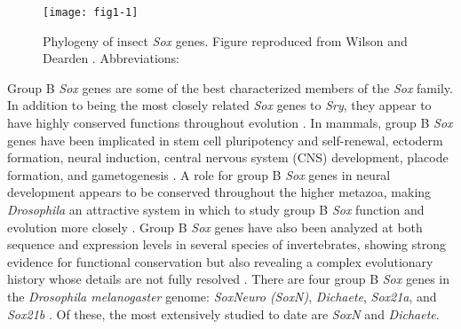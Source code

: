 \begin{figure}
\centering
\texttt{[image: fig1-1]}
\caption{Phylogeny of insect \emph{Sox} genes. Figure reproduced from Wilson and Dearden \citet{wilson_evolution_2008}. Abbreviations:}
\label{Figure 1.1}
\end{figure}

Group B \emph{Sox} genes are some of the best characterized members of the \emph{Sox} family. In addition to being the most closely related \emph{Sox} genes to \emph{Sry}, they appear to have highly conserved functions throughout evolution \citep{collignon_comparison_1996,mckimmie_conserved_2005}. In mammals, group B \emph{Sox} genes have been implicated in stem cell pluripotency and self-renewal, ectoderm formation, neural induction, central nervous system (CNS) development, placode formation, and gametogenesis \citep{guth_having_2008}. A role for group B \emph{Sox} genes in neural development appears to be conserved throughout the higher metazoa, making \emph{Drosophila} an attractive system in which to study group B \emph{Sox} function and evolution more closely \citep{uwanogho_embryonic_1995-1,wood_comparative_1999,wegner_stem_2005}. Group B \emph{Sox} genes have also been analyzed at both sequence and expression levels in several species of invertebrates, showing strong evidence for functional conservation but also revealing a complex evolutionary history whose details are not fully resolved \citep{wilson_evolution_2008,mckimmie_conserved_2005,wei_identification_2010,pioro_expression_2006,zhong_parallel_2011}. There are four group B \emph{Sox} genes in the \emph{Drosophila melanogaster} genome: \emph{SoxNeuro (SoxN)}, \emph{Dichaete}, \emph{Sox21a}, and \emph{Sox21b} \citep{mckimmie_conserved_2005}. Of these, the most extensively studied to date are \emph{SoxN} and \emph{Dichaete}.\\


